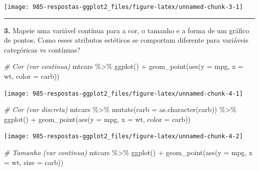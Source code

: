 \documentclass[
]{book}
\newenvironment{Shaded}{\begin{snugshade}}{\end{snugshade}}
\newcommand{\AttributeTok}[1]{\textcolor[rgb]{0.77,0.63,0.00}{#1}}
\newcommand{\CommentTok}[1]{\textcolor[rgb]{0.56,0.35,0.01}{\textit{#1}}}
\newcommand{\FunctionTok}[1]{\textcolor[rgb]{0.00,0.00,0.00}{#1}}
\newcommand{\NormalTok}[1]{#1}
\newcommand{\SpecialCharTok}[1]{\textcolor[rgb]{0.00,0.00,0.00}{#1}}
\begin{document}
\begin{center}\texttt{[image: 985-respostas-ggplot2\_files/figure-latex/unnamed-chunk-3-1]} \end{center}

\begin{center}\rule{0.5\linewidth}{0.5pt}\end{center}

\textbf{3.} Mapeie uma variável contínua para a cor, o tamanho e a forma de um gráfico de pontos. Como esses atributos estéticos se comportam diferente para variáveis categóricas vs contínuas?

\begin{Shaded}
\begin{Highlighting}[]
\CommentTok{\# Cor (var continua)}
\NormalTok{mtcars }\SpecialCharTok{\%\textgreater{}\%} 
  \FunctionTok{ggplot}\NormalTok{() }\SpecialCharTok{+}
  \FunctionTok{geom\_point}\NormalTok{(}\FunctionTok{aes}\NormalTok{(}\AttributeTok{y =}\NormalTok{ mpg, }\AttributeTok{x =}\NormalTok{ wt, }\AttributeTok{color =}\NormalTok{ carb))}
\end{Highlighting}
\end{Shaded}

\begin{center}\texttt{[image: 985-respostas-ggplot2\_files/figure-latex/unnamed-chunk-4-1]} \end{center}

\begin{Shaded}
\begin{Highlighting}[]
\CommentTok{\# Cor (var discreta)}
\NormalTok{mtcars }\SpecialCharTok{\%\textgreater{}\%} 
  \FunctionTok{mutate}\NormalTok{(}\AttributeTok{carb =} \FunctionTok{as.character}\NormalTok{(carb)) }\SpecialCharTok{\%\textgreater{}\%} 
  \FunctionTok{ggplot}\NormalTok{() }\SpecialCharTok{+}
  \FunctionTok{geom\_point}\NormalTok{(}\FunctionTok{aes}\NormalTok{(}\AttributeTok{y =}\NormalTok{ mpg, }\AttributeTok{x =}\NormalTok{ wt, }\AttributeTok{color =}\NormalTok{ carb))}
\end{Highlighting}
\end{Shaded}

\begin{center}\texttt{[image: 985-respostas-ggplot2\_files/figure-latex/unnamed-chunk-4-2]} \end{center}

\begin{Shaded}
\begin{Highlighting}[]
\CommentTok{\# Tamanho (var continua)}
\NormalTok{mtcars }\SpecialCharTok{\%\textgreater{}\%} 
  \FunctionTok{ggplot}\NormalTok{() }\SpecialCharTok{+}
  \FunctionTok{geom\_point}\NormalTok{(}\FunctionTok{aes}\NormalTok{(}\AttributeTok{y =}\NormalTok{ mpg, }\AttributeTok{x =}\NormalTok{ wt, }\AttributeTok{size =}\NormalTok{ carb))}
\end{Highlighting}
\end{Shaded}
\end{document}
